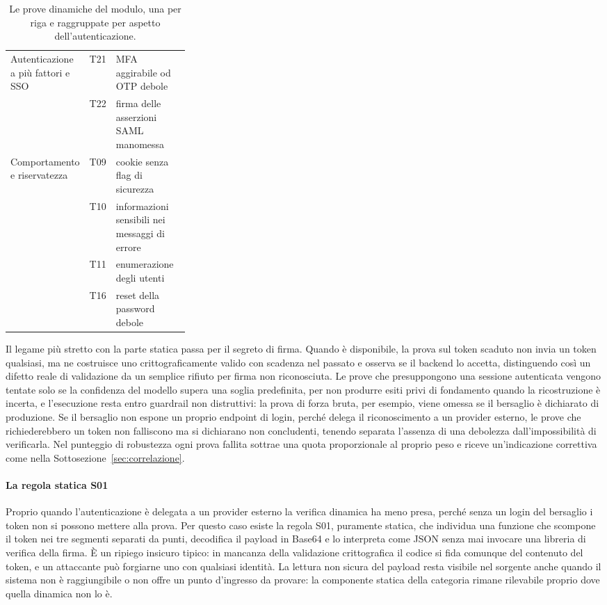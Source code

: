 \begin{table}[!htbp]
\begin{tabularx}{\linewidth}{@{}>{\raggedright\arraybackslash}p{0.3\linewidth}lX@{}}
    \midrule
    Autenticazione a più fattori e SSO & T21 & MFA aggirabile od OTP debole \\
    & T22 & firma delle asserzioni SAML manomessa \\
    \midrule
    Comportamento e riservatezza & T09 & cookie senza flag di sicurezza \\
    & T10 & informazioni sensibili nei messaggi di errore \\
    & T11 & enumerazione degli utenti \\
    & T16 & reset della password debole \\
    \bottomrule
  \end{tabularx}
  \caption[Batteria di prove dinamiche della Broken Authentication]{Le prove
    dinamiche del modulo, una per riga e raggruppate per aspetto
  dell'autenticazione.}
  \label{tab:test-auth}
\end{table}

Il legame più stretto con la parte statica passa per il segreto di firma.
Quando è disponibile, la prova sul token scaduto non invia un token qualsiasi,
ma ne costruisce uno crittograficamente valido con scadenza nel passato e
osserva se il backend lo accetta, distinguendo così un difetto reale di
validazione da un semplice rifiuto per firma non riconosciuta. Le prove che
presuppongono una sessione autenticata vengono tentate solo se la confidenza del
modello supera una soglia predefinita, per non produrre esiti privi di
fondamento quando la ricostruzione è incerta, e l'esecuzione resta entro
guardrail non distruttivi: la prova di forza bruta, per esempio, viene omessa se
il bersaglio è dichiarato di produzione. Se il bersaglio non espone un proprio
endpoint di login, perché delega il riconoscimento a un provider esterno, le
prove che richiederebbero un token non falliscono ma si dichiarano non
concludenti, tenendo separata l'assenza di una debolezza dall'impossibilità di
verificarla. Nel punteggio di robustezza ogni prova fallita sottrae una quota
proporzionale al proprio peso e riceve un'indicazione correttiva come nella
Sottosezione~\ref{sec:correlazione}.

\paragraph{La regola statica S01}
Proprio quando l'autenticazione è delegata a un provider esterno la verifica
dinamica ha meno presa, perché senza un login del bersaglio i token non si
possono mettere alla prova. Per questo caso esiste la regola S01, puramente
statica, che individua una funzione che scompone il token nei tre segmenti
separati da punti, decodifica il payload in Base64 e lo interpreta come JSON
senza mai invocare una libreria di verifica della firma. È un ripiego insicuro
tipico: in mancanza della validazione crittografica il codice si fida comunque
del contenuto del token, e un attaccante può forgiarne uno con qualsiasi
identità. La lettura non sicura del payload resta
visibile nel sorgente anche quando il sistema non è raggiungibile o non offre un
punto d'ingresso da provare: la componente statica della categoria rimane
rilevabile proprio dove quella dinamica non lo è.

